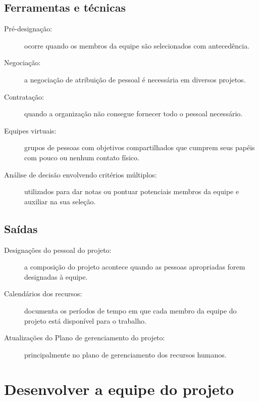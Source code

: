 \section{Ferramentas e técnicas}

\begin{description}
	
	\item[Pré-designação:] ocorre quando os membros da equipe são selecionados com antecedência.
	
	\item[Negociação:] a negociação de atribuição de pessoal é necessária em diversos projetos.
	
	\item[Contratação:] quando a organização não consegue fornecer todo o pessoal necessário.
	
	\item[Equipes virtuais:] grupos de pessoas com objetivos compartilhados que cumprem seus papéis com pouco ou nenhum contato físico.
	
	\item[Análise de decisão envolvendo critérios múltiplos:] utilizados para dar notas ou pontuar potenciais membros da equipe e auxiliar na sua seleção.
	
\end{description}

\section{Saídas}

\begin{description}

	\item[Designações do pessoal do projeto:] a composição do projeto acontece quando as pessoas apropriadas forem designadas à equipe.
	
	\item[Calendários dos recursos:] documenta os períodos de tempo em que cada membro da equipe do projeto está disponível para o trabalho.
	
	\item[Atualizações do Plano de gerenciamento do projeto:] principalmente no plano de gerenciamento dos recursos humanos.
	
\end{description}

\chapter{Desenvolver a equipe do projeto}

